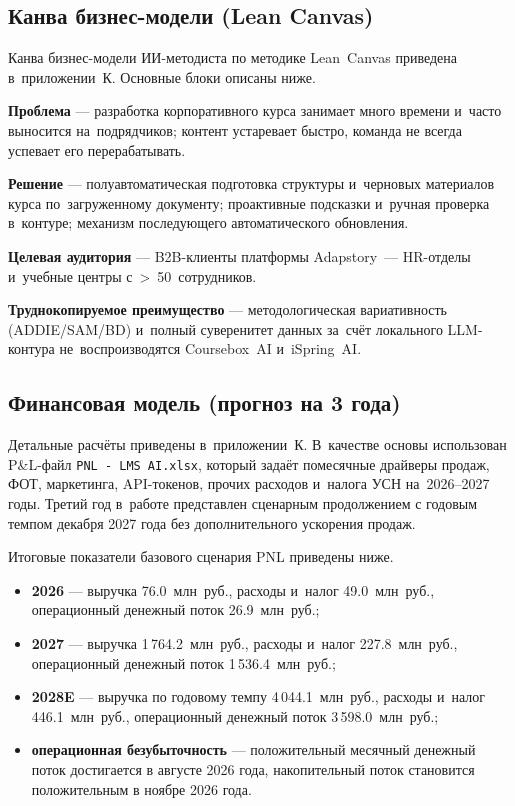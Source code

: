 \subsection[Канва бизнес-модели]{Канва бизнес-модели (Lean Canvas)}

Канва бизнес-модели ИИ-методиста по методике Lean~Canvas
\cite{maurya_lean_canvas_2012} приведена в~приложении~К. Основные блоки
описаны ниже.

\textbf{Проблема} — разработка корпоративного курса занимает много
времени и~часто выносится на~подрядчиков; контент устаревает
быстро, команда не всегда успевает его перерабатывать.

\textbf{Решение} — полуавтоматическая подготовка структуры и~черновых
материалов курса по~загруженному документу; проактивные подсказки
и~ручная проверка в~контуре; механизм последующего автоматического обновления.

\textbf{Целевая аудитория} — B2B-клиенты платформы Adapstory~—
HR-отделы и~учебные центры с~>~50~сотрудников.

\textbf{Труднокопируемое преимущество} — методологическая вариативность (ADDIE/SAM/BD)
и~полный суверенитет данных за~счёт локального LLM-контура не~воспроизводятся
Coursebox~AI и~iSpring~AI.

\subsection{Финансовая модель (прогноз на 3 года)}

Детальные расчёты приведены в~приложении~К. В~качестве основы
использован P\&L-файл \texttt{PNL - LMS AI.xlsx}, который задаёт помесячные
драйверы продаж, ФОТ, маркетинга, API-токенов, прочих расходов и~налога
УСН на~2026–2027 годы. Третий год в~работе представлен сценарным
продолжением с годовым темпом декабря 2027 года без дополнительного
ускорения продаж.

Итоговые показатели базового сценария PNL приведены ниже.

\begin{itemize}
  \item \textbf{2026} — выручка 76.0~млн~руб., расходы и~налог
    49.0~млн~руб., операционный денежный поток 26.9~млн~руб.;
  \item \textbf{2027} — выручка 1\,764.2~млн~руб., расходы и~налог
    227.8~млн~руб., операционный денежный поток 1\,536.4~млн~руб.;
  \item \textbf{2028E} — выручка по годовому темпу 4\,044.1~млн~руб.,
    расходы и~налог 446.1~млн~руб., операционный денежный поток
    3\,598.0~млн~руб.;
  \item \textbf{операционная безубыточность} — положительный месячный
    денежный поток достигается в августе 2026 года, накопительный поток
    становится положительным в ноябре 2026 года.
\end{itemize}

